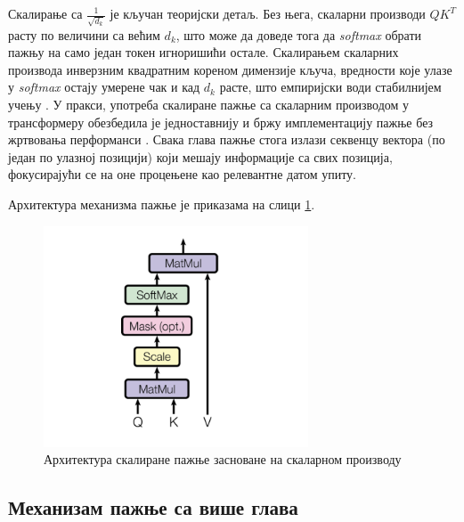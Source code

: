 Скалирање са $\frac{1}{\sqrt{d_k}}$ је кључан теоријски детаљ. Без њега, скаларни производи $QK^T$ расту по величини са већим $d_k$, што може да доведе тога да \textit{softmax} обрати пажњу на само један токен игноришићи остале. Скалирањем скаларних производа инверзним квадратним кореном димензије кључа, вредности које улазе у \textit{softmax} остају умерене чак и кад $d_k$ расте, што емпиријски води стабилнијем учењу \cite{vaswani_attention_2017,bahdanau_neural_2015}. У пракси, употреба скалиране пажње са скаларним производом у трансформеру обезбедила је једноставнију и бржу имплементацију пажње без жртвовања перформанси \cite{vaswani_attention_2017}. Свака глава пажње стога излази секвенцу вектора (по један по улазној позицији) који мешају информације са свих позиција, фокусирајући се на оне процењене као релевантне датом упиту.

Архитектура механизма пажње је приказама на слици \ref{fig:dot_attention}.

\begin{figure}[h]
    \centering
    \includegraphics[width=0.7\textwidth]{images/dot-attention.png}
    \caption{Архитектура скалиране пажње засноване на скаларном производу}
    \label{fig:dot_attention}
\end{figure}

\subsection{Механизам пажње са више глава}

